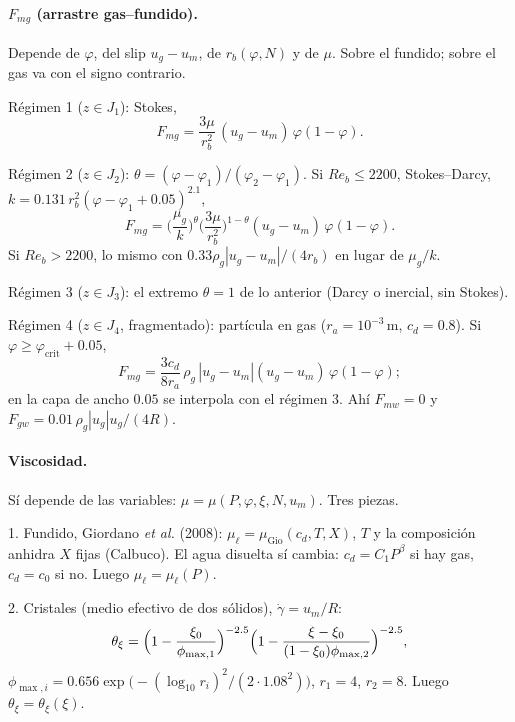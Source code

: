 \documentclass[11pt,a4paper]{article}
\begin{document}
\paragraph{$F_{mg}$ (arrastre gas--fundido).}
Depende de $\varphi$, del slip $u_g-u_m$, de $r_b(\varphi,N)$
y de $\mu$. Sobre el fundido; sobre el gas va con el signo
contrario.

Régimen 1 ($z\in J_1$): Stokes,
\begin{equation}
\label{eq:Fmg1}
F_{mg}
=\frac{3\mu}{r_b^2}\,(u_g-u_m)\,\varphi(1-\varphi).
\end{equation}

Régimen 2 ($z\in J_2$): $\theta=(\varphi-\varphi_1)/(\varphi_2-\varphi_1)$.
Si $Re_b\le 2200$, Stokes--Darcy, $k=0.131\,r_b^2(\varphi-\varphi_1+0.05)^{2.1}$,
\begin{equation}
\label{eq:Fmg2}
F_{mg}
=\Biggl(\frac{\mu_g}{k}\Biggr)^\theta
\Biggl(\frac{3\mu}{r_b^2}\Biggr)^{1-\theta}
(u_g-u_m)\,\varphi(1-\varphi).
\end{equation}
Si $Re_b>2200$, lo mismo con
$0.33\rho_g|u_g-u_m|/(4r_b)$ en lugar de $\mu_g/k$.

Régimen 3 ($z\in J_3$): el extremo $\theta=1$ de lo anterior
(Darcy o inercial, sin Stokes).

Régimen 4 ($z\in J_4$, fragmentado): partícula en gas
($r_a=10^{-3}\,\mathrm{m}$, $c_d=0.8$). Si
$\varphi\ge\varphi_{\mathrm{crit}}+0.05$,
\begin{equation}
\label{eq:Fmg4}
F_{mg}
=\frac{3c_d}{8r_a}\,\rho_g\,|u_g-u_m|(u_g-u_m)\,\varphi(1-\varphi);
\end{equation}
en la capa de ancho $0.05$ se interpola con el régimen 3.
Ahí $F_{mw}=0$ y
$F_{gw}=0.01\,\rho_g|u_g|u_g/(4R)$.

\paragraph{Viscosidad.}
Sí depende de las variables:
$\mu=\mu(P,\varphi,\xi,N,u_m)$. Tres piezas.

1. Fundido, Giordano \emph{et al.} (2008):
$\mu_\ell=\mu_{\mathrm{Gio}}(c_d,T,X)$, $T$ y la composición
anhidra $X$ fijas (Calbuco). El agua disuelta sí cambia:
$c_d=C_1 P^\beta$ si hay gas, $c_d=c_0$ si no. Luego
$\mu_\ell=\mu_\ell(P)$.

2. Cristales (medio efectivo de dos sólidos),
$\dot\gamma=u_m/R$:
\begin{equation}
\label{eq:thxi}
\theta_\xi
=\Bigl(1-\frac{\xi_0}{\phi_{\max,1}}\Bigr)^{-2.5}
\Bigl(1-\frac{\xi-\xi_0}{(1-\xi_0)\phi_{\max,2}}\Bigr)^{-2.5},
\end{equation}
$\phi_{\max,i}=0.656\exp\bigl(-(\log_{10}r_i)^2/(2\cdot1.08^2)\bigr)$,
$r_1=4$, $r_2=8$. Luego $\theta_\xi=\theta_\xi(\xi)$.
\end{document}
